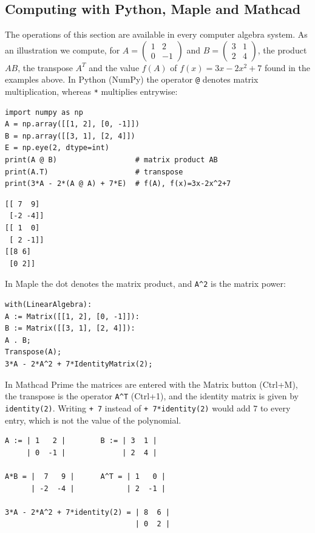 \subsection{Computing with Python, Maple and Mathcad}
The operations of this section are available in every computer algebra system.
As an illustration we compute, for $A=\begin{pmatrix}1 & 2\\ 0 & -1\end{pmatrix}$
and $B=\begin{pmatrix}3 & 1\\ 2 & 4\end{pmatrix}$, the product $AB$, the
transpose $A^{T}$ and the value $f(A)$ of $f(x)=3x-2x^2+7$ found in the examples
above. In Python (NumPy) the operator \verb|@| denotes matrix multiplication,
whereas \verb|*| multiplies entrywise:
\begin{Verbatim}[fontsize=\footnotesize,frame=single,label={\small Python}]
import numpy as np
A = np.array([[1, 2], [0, -1]])
B = np.array([[3, 1], [2, 4]])
E = np.eye(2, dtype=int)
print(A @ B)                  # matrix product AB
print(A.T)                    # transpose
print(3*A - 2*(A @ A) + 7*E)  # f(A), f(x)=3x-2x^2+7
\end{Verbatim}
\begin{Verbatim}[fontsize=\footnotesize,frame=single,label={\small Output}]
[[ 7  9]
 [-2 -4]]
[[ 1  0]
 [ 2 -1]]
[[8 6]
 [0 2]]
\end{Verbatim}
In Maple the dot denotes the matrix product, and \verb|A^2| is the matrix power:
\begin{Verbatim}[fontsize=\footnotesize,frame=single,label={\small Maple}]
with(LinearAlgebra):
A := Matrix([[1, 2], [0, -1]]):
B := Matrix([[3, 1], [2, 4]]):
A . B;
Transpose(A);
3*A - 2*A^2 + 7*IdentityMatrix(2);
\end{Verbatim}
In Mathcad Prime the matrices are entered with the Matrix button (Ctrl+M), the
transpose is the operator \verb|A^T| (Ctrl+1), and the identity matrix is given by
\verb|identity(2)|. Writing \verb|+ 7| instead of \verb|+ 7*identity(2)| would add
$7$ to every entry, which is not the value of the polynomial.
\begin{Verbatim}[fontsize=\footnotesize,frame=single,label={\small Mathcad}]
A := | 1   2 |        B := | 3  1 |
     | 0  -1 |             | 2  4 |

A*B = |  7   9 |      A^T = | 1   0 |
      | -2  -4 |            | 2  -1 |

3*A - 2*A^2 + 7*identity(2) = | 8  6 |
                              | 0  2 |
\end{Verbatim}

